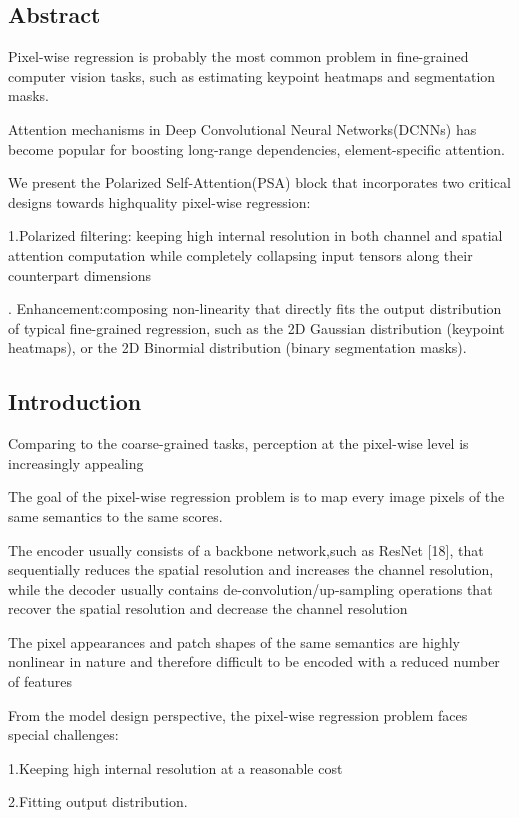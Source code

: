 \documentclass[11pt]{article}
\begin{document}
\subsection{Abstract}
Pixel-wise regression is probably the most common problem in fine-grained computer vision tasks, such as estimating keypoint heatmaps and segmentation masks.

Attention mechanisms in Deep Convolutional Neural Networks(DCNNs) has become popular for boosting
long-range dependencies, element-specific attention.

We present the Polarized Self-Attention(PSA) block that incorporates two critical designs towards highquality pixel-wise regression:

\noindent1.Polarized filtering: keeping high internal resolution in both channel and spatial attention computation while completely collapsing input tensors along their counterpart dimensions

. Enhancement:composing non-linearity that directly fits the output distribution of typical fine-grained regression, such as the 2D Gaussian distribution (keypoint heatmaps), or the 2D Binormial distribution (binary segmentation masks).

\subsection{Introduction}
Comparing to the coarse-grained tasks, perception at the pixel-wise level is increasingly appealing

The goal of the pixel-wise regression problem is to map every image pixels of the same semantics to the same scores.

The encoder usually consists of a backbone network,such as ResNet [18], that sequentially reduces the spatial resolution and increases the channel resolution, while the decoder usually contains de-convolution/up-sampling operations that recover the spatial resolution and decrease the channel resolution

The pixel appearances and patch shapes of the same semantics are highly nonlinear in nature and therefore difficult to be encoded with a reduced number of features

From the model design perspective, the pixel-wise regression problem faces special challenges:

\noindent1.Keeping high internal resolution at a reasonable cost

\noindent2.Fitting output distribution.
\end{document}
